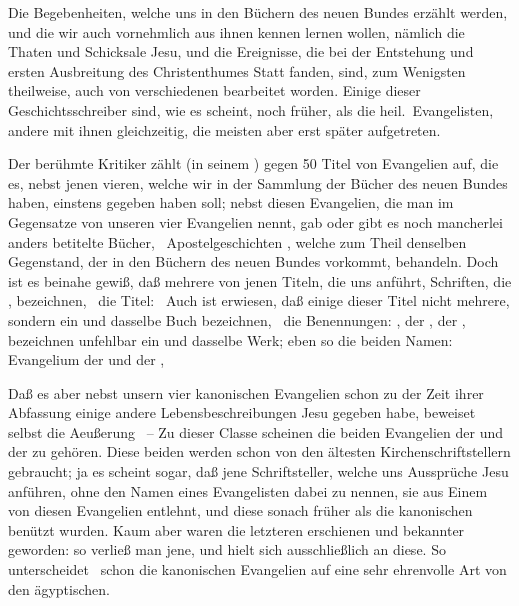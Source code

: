 \begin{aufza}
\item Die Begebenheiten, welche uns in den Büchern des neuen Bundes erzählt werden, und die wir auch vornehmlich aus ihnen kennen lernen wollen, nämlich die Thaten und Schicksale Jesu, und die Ereignisse, die bei der Entstehung und ersten Ausbreitung des Christenthumes Statt fanden, sind, zum Wenigsten theilweise, auch von verschiedenen  bearbeitet worden. Einige dieser Geschichtsschreiber sind, wie es scheint, noch früher, als die heil.\ Evangelisten, andere mit ihnen gleichzeitig, die meisten aber erst später aufgetreten.
\item Der berühmte Kritiker  zählt (in seinem ) gegen 50 Titel von Evangelien auf, die es, nebst jenen vieren, welche wir in der Sammlung der Bücher des neuen Bundes haben, einstens gegeben haben soll; nebst diesen Evangelien, die man im Gegensatze von unseren vier Evangelien  nennt, gab oder gibt es noch mancherlei anders betitelte Bücher, \zB\ Apostelgeschichten \udgl , welche zum Theil denselben Gegenstand, der in den Büchern des neuen Bundes vorkommt, behandeln. Doch ist es beinahe gewiß, daß mehrere von jenen Titeln, die uns  anführt, Schriften, die , bezeichnen, \zB\ die Titel:  \udgl\  Auch ist erwiesen, daß einige dieser Titel nicht mehrere, sondern ein und dasselbe Buch bezeichnen, \zB\ die Benennungen: , der , der , bezeichnen unfehlbar ein und dasselbe Werk; eben so die beiden Namen: Evangelium der  und der , \usw
\item Daß es aber nebst unsern vier kanonischen Evangelien schon zu der Zeit ihrer Abfassung einige andere Lebensbeschreibungen Jesu gegeben habe, beweiset selbst die Aeußerung \ -- Zu dieser Classe scheinen die beiden Evangelien der  und der  zu gehören. Diese beiden werden schon von den ältesten Kirchenschriftstellern gebraucht; ja es scheint sogar, daß jene Schriftsteller, welche uns Aussprüche Jesu anführen, ohne den Namen eines Evangelisten dabei zu nennen, sie aus Einem von diesen Evangelien entlehnt, und diese sonach früher als die kanonischen benützt wurden. Kaum aber waren die letzteren erschienen und bekannter geworden: so verließ man jene, und hielt sich ausschließlich an diese. So unterscheidet \zB\ schon  die kanonischen Evangelien auf eine sehr ehrenvolle Art von den ägyptischen.

\end{aufza}
